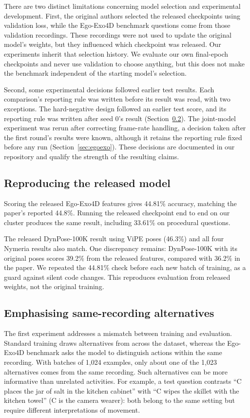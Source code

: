 \documentclass[10pt,twocolumn,letterpaper]{article}
\begin{document}
There are two distinct limitations concerning model selection and experimental development. First, the original
authors selected the released checkpoints using validation loss, while the Ego-Exo4D benchmark questions come from
those validation recordings. These recordings were not used to update the original model's weights, but they
influenced which checkpoint was released. Our experiments inherit that selection history. We evaluate our own
final-epoch checkpoints and never use validation to choose anything, but this does not make the benchmark
independent of the starting model's selection.

Second, some experimental decisions followed earlier test results. Each comparison's reporting rule was written
before its result was read, with two exceptions. The hard-negative design followed an earlier test score, and its
reporting rule was written after seed 0's result (Section~\ref{sec:hn}). The joint-model experiment was rerun after
correcting frame-rate handling, a decision taken after the first round's results were known, although it retains
the reporting rule fixed before any run (Section~\ref{sec:egoexo}). These decisions are documented in our repository
and qualify the strength of the resulting claims.

\subsection{Reproducing the released model}
\label{sec:repro}
Scoring the released Ego-Exo4D features gives 44.81\% accuracy, matching the paper's reported 44.8\%. Running the
released checkpoint end to end on our cluster produces the same result, including 33.61\% on procedural questions.

The released DynPose-100K result using ViPE poses (46.3\%) and all four Nymeria results also match. One discrepancy
remains: DynPose-100K with its original poses scores 39.2\% from the released features, compared with 36.2\% in the
paper. We repeated the 44.81\% check before each new batch of training, as a guard against silent code changes. This
reproduces evaluation from released weights, not the original training.

\subsection{Emphasising same-recording alternatives}
\label{sec:hn}
The first experiment addresses a mismatch between training and evaluation. Standard training draws alternatives
from across the dataset, whereas the Ego-Exo4D benchmark asks the model to distinguish actions within the same
recording. With batches of 1,024 examples, only about one of the 1,023 alternatives comes from the same recording.
Such alternatives can be more informative than unrelated activities. For example, a test question contrasts ``C
places the jar of salt in the kitchen cabinet'' with ``C wipes the skillet with the kitchen towel'' (C is the
camera wearer): both belong to the same setting but require different interpretations of movement.
\end{document}

